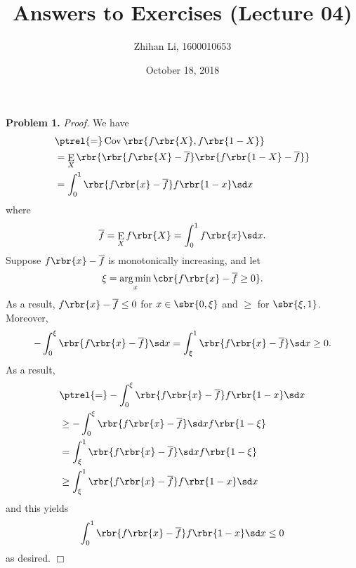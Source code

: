 \documentclass[english, nochinese]{pnote}
\title{Answers to Exercises (Lecture 04)}
\author{Zhihan Li, 1600010653}
\date{October 18, 2018}
\DeclareMathOperator\opcov{\mathrm{Cov}}
\DeclareMathOperator\ope{\mathrm{E}}
\begin{document}
\maketitle

\textbf{Problem 1.} \textit{Proof.} We have
\begin{equation}
\begin{split}
&\ptrel{=} \opcov \rbr{ f \rbr{X}, f \rbr{ 1 - X } } \\
&= \ope_X \rbr{ \rbr{ f \rbr{X} - \overline{f} } \rbr{ f \rbr{ 1 - X } - \overline{f} } } \\
&= \int_0^1 \rbr{ f \rbr{x} - \overline{f} } f \rbr{ 1 - x } \sd x
\end{split}
\end{equation}
where
\begin{equation}
\overline{f} = \ope_X f \rbr{X} = \int_0^1 f \rbr{x} \sd x.
\end{equation}
Suppose $ f \rbr{x} - \overline{f} $ is monotonically increasing, and let
\begin{equation}
\xi = \mathop{\arg\min}_x \cbr{ f \rbr{x} - \overline{f} \ge 0 }.
\end{equation}
As a result, $ f \rbr{x} - \overline{f} \le 0 $ for $ x \in \sbr{ 0, \xi } $ and $\ge$ for $ \sbr{ \xi, 1 } $. Moreover,
\begin{equation}
-\int_0^{\xi} \rbr{ f \rbr{x} - \overline{f} } \sd x = \int_{\xi}^1 \rbr{ f \rbr{x} - \overline{f} } \sd x \ge 0.
\end{equation}
As a result,
\begin{equation}
\begin{split}
&\ptrel{=} -\int_0^{\xi} \rbr{ f \rbr{x} - \overline{f} } f \rbr{ 1 - x } \sd x \\
&\ge -\int_0^{\xi} \rbr{ f \rbr{x} - \overline{f} } \sd x f \rbr{ 1 - \xi } \\
&= \int_{\xi}^1 \rbr{ f \rbr{x} - \overline{f} } \sd x f \rbr{ 1 - \xi } \\
&\ge \int_{\xi}^1 \rbr{ f \rbr{x} - \overline{f} } f \rbr{ 1 - x } \sd x
\end{split}
\end{equation}
and this yields
\begin{equation}
\int_0^1 \rbr{ f \rbr{x} - \overline{f} } f \rbr{ 1 - x } \sd x \le 0
\end{equation}
as desired.
\hfill$\Box$
\end{document}
